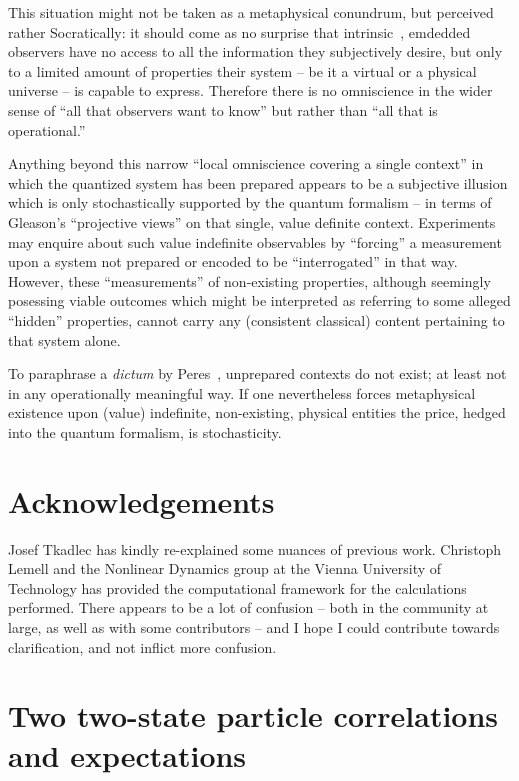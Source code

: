 \documentclass[%
  twocolumn,
 showpacs,
 showkeys,
 preprintnumbers,
 amsmath,amssymb,
 aps,
  pra,
  longbibliography,
 floatfix,
 ]{revtex4-1}
\begin{document}
This situation might not be taken as a metaphysical conundrum, but perceived rather Socratically:
it should come as no surprise that intrinsic~\cite{svozil-94}, emdedded~\cite{toffoli:79}
observers have no access to
all the information they subjectively desire, but only to a limited amount of properties
their system -- be it a virtual or a physical universe -- is capable to express.
Therefore there is no omniscience in the wider sense of ``all that observers want to know''
but rather than ``all that is operational.''

Anything beyond this narrow ``local omniscience covering a single context''
in which the quantized system has been prepared
appears to be a subjective illusion which is only stochastically  supported by the quantum formalism --
in terms of Gleason's ``projective views'' on that single, value definite context.
Experiments may enquire about such value indefinite observables by ``forcing'' a measurement upon
a system not prepared or encoded to be ``interrogated'' in that way.
However,  these ``measurements'' of non-existing properties,
although seemingly posessing viable outcomes
which might be interpreted as referring to some alleged ``hidden'' properties,
cannot carry any (consistent classical) content pertaining to that system alone.

To paraphrase a {\it dictum} by Peres~\cite{peres222}, unprepared contexts do not exist;
at least not in any operationally meaningful way.
If one nevertheless forces metaphysical existence upon (value) indefinite, non-existing, physical entities
the price, hedged into the quantum formalism, is stochasticity.

\section*{Acknowledgements}


Josef Tkadlec has kindly re-explained some nuances of previous work.
Christoph Lemell and the Nonlinear Dynamics group at the Vienna University of Technology
has provided  the computational framework for the calculations performed.
There appears to be a lot of confusion  -- both in the community at large, as well as with some contributors
-- and I hope I could contribute towards clarification, and not inflict more confusion.



\appendix


\section{Two two-state particle correlations and expectations}
\label{2017-b-ch-appe-cts}
\end{document}
